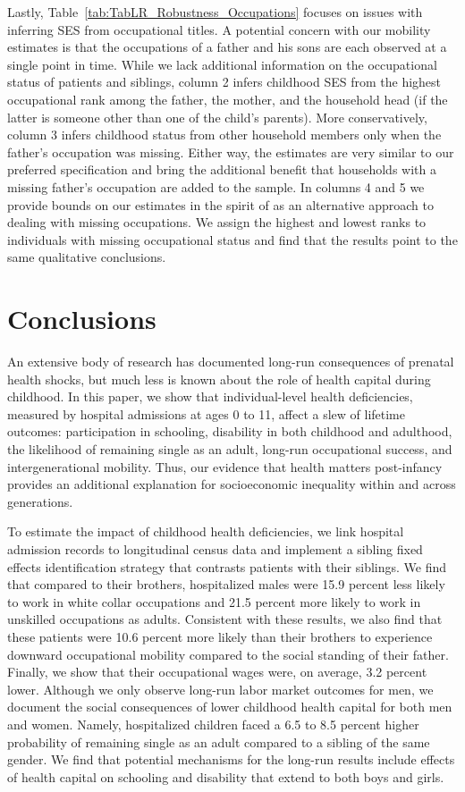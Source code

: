 \documentclass[12pt,english]{article}
\begin{document}
Lastly, Table~\ref{tab:TabLR_Robustness_Occupations} focuses on issues with inferring SES from occupational titles. A potential concern with our mobility estimates is that the occupations of a father and his sons are each observed at a single point in time. While we lack additional information on the occupational status of patients and siblings, column 2 infers childhood SES from the highest occupational rank among the father, the mother, and the household head (if the latter is someone other than one of the child's parents). More conservatively, column 3 infers childhood status from other household members only when the father's occupation was missing. Either way, the estimates are very similar to our preferred specification and bring the additional benefit that households with a missing father's occupation are added to the sample. In columns 4 and 5 we provide bounds on our estimates in the spirit of \citet{Lee2009} as an alternative approach to dealing with missing occupations. We assign the highest and lowest ranks to individuals with missing occupational status and find that the results point to the same qualitative conclusions.

\section[Conclusions]{Conclusions}\label{sec:conclusion}

An extensive body of research has documented long-run consequences of prenatal health shocks, but much less is known about the role of health capital during childhood. In this paper, we show that individual-level health deficiencies, measured by hospital admissions at ages 0 to 11, affect a slew of lifetime outcomes: participation in schooling, disability in both childhood and adulthood, the likelihood of remaining single as an adult, long-run occupational success, and intergenerational mobility. Thus, our evidence that health matters post-infancy provides an additional explanation for socioeconomic inequality within and across generations.

To estimate the impact of childhood health deficiencies, we link hospital admission records to longitudinal census data and implement a sibling fixed effects identification strategy that contrasts patients with their siblings. We find that compared to their brothers, hospitalized males were 15.9 percent less likely to work in white collar occupations and 21.5 percent more likely to work in unskilled occupations as adults. Consistent with these results, we also find that these patients were 10.6 percent more likely than their brothers to experience downward occupational mobility compared to the social standing of their father. Finally, we show that their occupational wages were, on average, 3.2 percent lower. Although we only observe long-run labor market outcomes for men, we document the social consequences of lower childhood health capital for both men and women. Namely, hospitalized children faced a 6.5 to 8.5 percent higher probability of remaining single as an adult compared to a sibling of the same gender. We find that potential mechanisms for the long-run results include effects of health capital on schooling and disability that extend to both boys and girls. 
\end{document}
